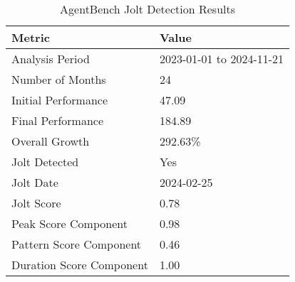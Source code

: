
\begin{table}[ht]
\centering
\caption{AgentBench Jolt Detection Results}
\label{tab:agentbench_jolt}
\begin{tabular}{ll}
\toprule
\textbf{Metric} & \textbf{Value} \\
\midrule
Analysis Period & 2023-01-01 to 2024-11-21 \\
Number of Months & 24 \\
Initial Performance & 47.09 \\
Final Performance & 184.89 \\
Overall Growth & 292.63\% \\
\midrule
Jolt Detected & Yes \\
Jolt Date & 2024-02-25 \\
Jolt Score & 0.78 \\
\midrule
Peak Score Component & 0.98 \\
Pattern Score Component & 0.46 \\
Duration Score Component & 1.00 \\
\bottomrule
\end{tabular}
\end{table}
